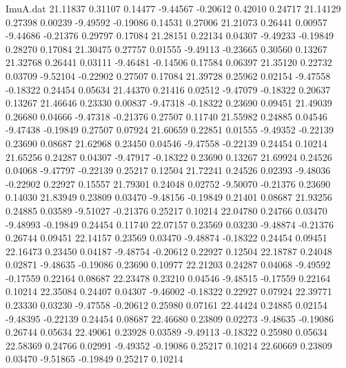 \begin{filecontents}{ImuA.dat}
  21.11837    0.31107    0.14477   -9.44567   -0.20612    0.42010    0.24717
  21.14129    0.27398    0.00239   -9.49592   -0.19086    0.14531    0.27006
  21.21073    0.26441    0.00957   -9.44686   -0.21376    0.29797    0.17084
  21.28151    0.22134    0.04307   -9.49233   -0.19849    0.28270    0.17084
  21.30475    0.27757    0.01555   -9.49113   -0.23665    0.30560    0.13267
  21.32768    0.26441    0.03111   -9.46481   -0.14506    0.17584    0.06397
  21.35120    0.22732    0.03709   -9.52104   -0.22902    0.27507    0.17084
  21.39728    0.25962    0.02154   -9.47558   -0.18322    0.24454    0.05634
  21.44370    0.21416    0.02512   -9.47079   -0.18322    0.20637    0.13267
  21.46646    0.23330    0.00837   -9.47318   -0.18322    0.23690    0.09451
  21.49039    0.26680    0.04666   -9.47318   -0.21376    0.27507    0.11740
  21.55982    0.24885    0.04546   -9.47438   -0.19849    0.27507    0.07924
  21.60659    0.22851    0.01555   -9.49352   -0.22139    0.23690    0.08687
  21.62968    0.23450    0.04546   -9.47558   -0.22139    0.24454    0.10214
  21.65256    0.24287    0.04307   -9.47917   -0.18322    0.23690    0.13267
  21.69924    0.24526    0.04068   -9.47797   -0.22139    0.25217    0.12504
  21.72241    0.24526    0.02393   -9.48036   -0.22902    0.22927    0.15557
  21.79301    0.24048    0.02752   -9.50070   -0.21376    0.23690    0.14030
  21.83949    0.23809    0.03470   -9.48156   -0.19849    0.21401    0.08687
  21.93256    0.24885    0.03589   -9.51027   -0.21376    0.25217    0.10214
  22.04780    0.24766    0.03470   -9.48993   -0.19849    0.24454    0.11740
  22.07157    0.23569    0.03230   -9.48874   -0.21376    0.26744    0.09451
  22.14157    0.23569    0.03470   -9.48874   -0.18322    0.24454    0.09451
  22.16473    0.23450    0.04187   -9.48754   -0.20612    0.22927    0.12504
  22.18787    0.24048    0.02871   -9.48635   -0.19086    0.23690    0.10977
  22.21203    0.24287    0.04068   -9.49592   -0.17559    0.22164    0.08687
  22.23478    0.23210    0.04546   -9.48515   -0.17559    0.22164    0.10214
  22.35084    0.24407    0.04307   -9.46002   -0.18322    0.22927    0.07924
  22.39771    0.23330    0.03230   -9.47558   -0.20612    0.25980    0.07161
  22.44424    0.24885    0.02154   -9.48395   -0.22139    0.24454    0.08687
  22.46680    0.23809    0.02273   -9.48635   -0.19086    0.26744    0.05634
  22.49061    0.23928    0.03589   -9.49113   -0.18322    0.25980    0.05634
  22.58369    0.24766    0.02991   -9.49352   -0.19086    0.25217    0.10214
  22.60669    0.23809    0.03470   -9.51865   -0.19849    0.25217    0.10214

\end{filecontents}
